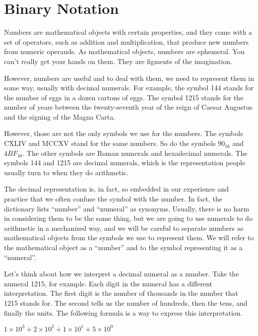 \chapter{Binary Notation}


Numbers are mathematical objects with certain properties,
and they come with a set of operators, such as addition
and multiplication, that produce new numbers from numeric
operands.
As mathematical objects, numbers are ephemeral.
You can't really get your hands on them.
They are figments of the imagination.

However, numbers are useful and to deal with them,
we need to represent them in some way, usually with decimal numerals.
For example, the symbol 144 stands for the number
of eggs in a dozen cartons of eggs.
The symbol 1215 stands for the number of
years between the twenty-seventh year of the reign
of Caesar Augustus and the signing of the Magna Carta.

However, those are not the only symbols we use for the numbers.
The symbols CXLIV and MCCXV stand for the same numbers.
So do the symbols $90_{16}$ and $4BF_{16}$.
The other symbols are Roman numerals and hexadecimal numerals.
The symbols 144 and 1215 are decimal numerals,
which is the representation
people usually turn to when they do arithmetic.

The decimal representation is, in fact, so embedded in
our experience and practice that we often confuse
the symbol with the number.
In fact, the dictionary lists ``number'' and ``numeral'' as synonyms.
Usually, there is no harm in considering them to be the same thing,
but we are going to use numerals
to do arithmetic in a mechanized way, and we will
be careful to separate numbers as mathematical
objects from the symbols we use to represent them.
We will refer to the mathematical object as a ``number''
and to the symbol representing it as a ``numeral''.

Let's think about how we interpret a decimal numeral as a number.
Take the numeral 1215, for example.
Each digit in the numeral has a different interpretation.
The first digit is the number of thousands in the number
that 1215 stands for. The second tells us the number
of hundreds, then the tens, and finally the units.
The following formula is a way to express this interpretation.

\begin{center}
$1 \times 10^3 + 2 \times 10^2 + 1 \times 10^1 + 5 \times 10^0$
\end{center}

